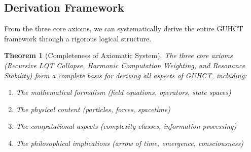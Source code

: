 \documentclass[11pt,a4paper]{article}
\newtheorem{theorem}{Theorem}[section]
\begin{document}
\subsection{Derivation Framework}
\label{subsec:derivation_framework_axioms} %

From the three core axioms, we can systematically derive the entire GUHCT framework through a rigorous logical structure.

\begin{theorem}[Completeness of Axiomatic System]
\label{thm:axiom_completeness}
The three core axioms (Recursive LQT Collapse, Harmonic Computation Weighting, and Resonance Stability) form a complete basis for deriving all aspects of GUHCT, including:
\begin{enumerate}
    \item The mathematical formalism (field equations, operators, state spaces)
    \item The physical content (particles, forces, spacetime)
    \item The computational aspects (complexity classes, information processing)
    \item The philosophical implications (arrow of time, emergence, consciousness)
\end{enumerate}
\end{theorem}
\end{document}
